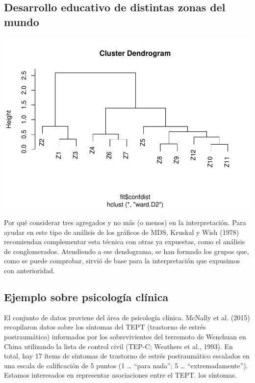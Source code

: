 \documentclass[]{article}
\begin{document}
\subsection{Desarrollo educativo de distintas zonas del
mundo}\label{desarrollo-educativo-de-distintas-zonas-del-mundo-14}

\hypertarget{left}{}
\includegraphics{Clase-4_files/figure-latex/unnamed-chunk-26-1.pdf}

\hypertarget{right}{}
Por qué considerar tres agregados y no más (o menos) en la
interpretación. Para ayudar en este tipo de análisis de los gráficos de
MDS, Kruskal y Wish (1978) recomiendan complementar esta técnica con
otras ya expuestas, como el análisis de conglomerados. Atendiendo a ese
dendograma, se han formado los grupos que, como se puede comprobar,
sirvió de base para la interpretación que expusimos con anterioridad.

\subsection{Ejemplo sobre psicología
clínica}\label{ejemplo-sobre-psicologuxeda-cluxednica}

El conjunto de datos proviene del área de psicología clínica. McNally et
al. (2015) recopilaron datos sobre los síntomas del TEPT (trastorno de
estrés postraumático) informados por los sobrevivientes del terremoto de
Wenchuan en China utilizando la lista de control civil (TEP-C; Weathers
et al., 1993). En total, hay 17 ítems de síntomas de trastorno de estrés
postraumático escalados en una escala de calificación de 5 puntos (1
\ldots{} ``para nada''; 5 \ldots{} ``extremadamente''). Estamos
interesados en representar asociaciones entre el TEPT. los síntomas.
\end{document}

